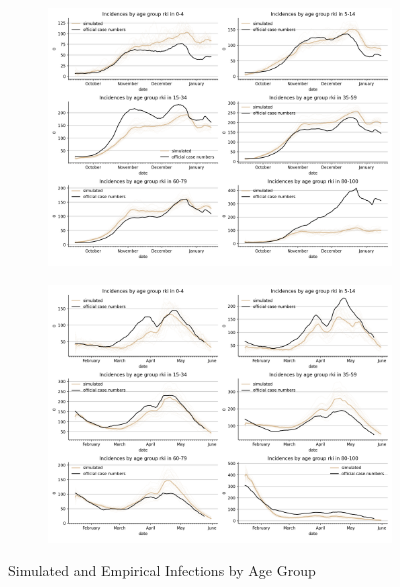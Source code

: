 \begin{figure}[ht]
\centering
\begin{subfigure}{.6\textwidth}
  \includegraphics[width=0.9 \textwidth]{../figures/results/figures/incidences_by_group/age_group_rki/full_fall_baseline_new_known_case}
\end{subfigure}%
\begin{subfigure}{.6\textwidth}
  \includegraphics[width=0.9 \textwidth]{../figures/results/figures/incidences_by_group/age_group_rki/full_spring_baseline_new_known_case}
\end{subfigure}
\caption{Simulated and Empirical Infections by Age Group}
\label{fig:age_group_fit}
\end{figure}


